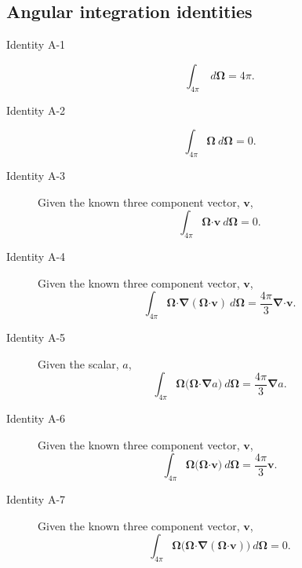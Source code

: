 \documentclass[10pt,letterpaper,notitlepage]{article}
\numberwithin{equation}{section}
\newcommand{\Omegabf}{\mathbf{\Omega}}
\newcommand{\bnabla}{\boldsymbol{\nabla}}
\newcommand{\dotp}{\boldsymbol{\cdot}}
\begin{document}
\newpage
\begin{appendices}
\section{Angular integration identities} \label{appendix:angle_integration_identities}
\begin{description}
	\item [Identity A-1]
	$$\int_{4\pi}  \ d\Omegabf = 4\pi.$$
	
	\item [Identity A-2]
	$$\int_{4\pi} \Omegabf \ d\Omegabf = 0.$$
	
	\item [Identity A-3] Given the known three component vector, $\mathbf{v}$,
	$$\int_{4\pi} \Omegabf \dotp \mathbf{v} \ d\Omegabf = 0.$$
	
	\item [Identity A-4] Given the known three component vector, $\mathbf{v}$,
	$$\int_{4\pi} \Omegabf \dotp \bnabla (\Omegabf \dotp \mathbf{v}) \ d\Omegabf = \frac{4\pi}{3} \bnabla \dotp \mathbf{v}.$$
	
	\item [Identity A-5] Given the scalar, $a$,
	$$\int_{4\pi} \Omegabf \biggr( \Omegabf \dotp \bnabla a \biggr) \ d\Omegabf = \frac{4\pi}{3} \bnabla a.$$
	
	\item [Identity A-6] Given the known three component vector, $\mathbf{v}$,
	$$\int_{4\pi} \Omegabf \biggr( \Omegabf \dotp \mathbf{v} \biggr) \ d\Omegabf = \frac{4\pi}{3} \mathbf{v} .$$
	
	\item [Identity A-7] Given the known three component vector, $\mathbf{v}$,
	$$\int_{4\pi} \Omegabf \biggr( \Omegabf \dotp \bnabla (\Omegabf \dotp \mathbf{v}) \biggr) \ d\Omegabf = 0 .$$
	
\end{description}

\end{appendices}
\end{document}
